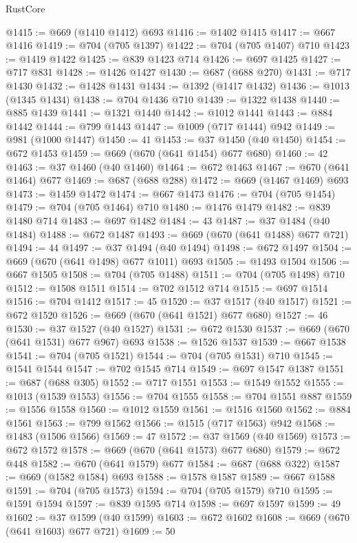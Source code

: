 \begin{lexlean}{RustCore}
\begin{coremodule}
@1415 := @669 (@1410 @1412) @693
@1416 := @1402 @1415
@1417 := @667 @1416
@1419 := @704 (@705 @1397)
@1422 := @704 (@705 @1407) @710
@1423 := @1419 @1422
@1425 := @839 @1423 @714
@1426 := @697 @1425
@1427 := @717 @831
@1428 := @1426 @1427
@1430 := @687 (@688 @270)
@1431 := @717 @1430
@1432 := @1428 @1431
@1434 := @1392 (@1417 @1432)
@1436 := @1013 (@1345 @1434)
@1438 := @704 @1436 @710
@1439 := @1322 @1438
@1440 := @885 @1439
@1441 := @1321 @1440
@1442 := @1012 @1441
@1443 := @884 @1442
@1444 := @799 @1443
@1447 := @1009 (@717 @1444) @942
@1449 := @981 (@1000 @1447)
@1450 := 41
@1453 := @37 @1450 (@40 @1450)
@1454 := @672 @1453
@1459 := @669 (@670 (@641 @1454) @677 @680)
@1460 := 42
@1463 := @37 @1460 (@40 @1460)
@1464 := @672 @1463
@1467 := @670 (@641 @1464) @677
@1469 := @687 (@688 @288)
@1472 := @669 (@1467 @1469) @693
@1473 := @1459 @1472
@1474 := @667 @1473
@1476 := @704 (@705 @1454)
@1479 := @704 (@705 @1464) @710
@1480 := @1476 @1479
@1482 := @839 @1480 @714
@1483 := @697 @1482
@1484 := 43
@1487 := @37 @1484 (@40 @1484)
@1488 := @672 @1487
@1493 := @669 (@670 (@641 @1488) @677 @721)
@1494 := 44
@1497 := @37 @1494 (@40 @1494)
@1498 := @672 @1497
@1504 := @669 (@670 (@641 @1498) @677 @1011) @693
@1505 := @1493 @1504
@1506 := @667 @1505
@1508 := @704 (@705 @1488)
@1511 := @704 (@705 @1498) @710
@1512 := @1508 @1511
@1514 := @702 @1512 @714
@1515 := @697 @1514
@1516 := @704 @1412
@1517 := 45
@1520 := @37 @1517 (@40 @1517)
@1521 := @672 @1520
@1526 := @669 (@670 (@641 @1521) @677 @680)
@1527 := 46
@1530 := @37 @1527 (@40 @1527)
@1531 := @672 @1530
@1537 := @669 (@670 (@641 @1531) @677 @967) @693
@1538 := @1526 @1537
@1539 := @667 @1538
@1541 := @704 (@705 @1521)
@1544 := @704 (@705 @1531) @710
@1545 := @1541 @1544
@1547 := @702 @1545 @714
@1549 := @697 @1547 @1387
@1551 := @687 (@688 @305)
@1552 := @717 @1551
@1553 := @1549 @1552
@1555 := @1013 (@1539 @1553)
@1556 := @704 @1555
@1558 := @704 @1551 @887
@1559 := @1556 @1558
@1560 := @1012 @1559
@1561 := @1516 @1560
@1562 := @884 @1561
@1563 := @799 @1562
@1566 := @1515 (@717 @1563) @942
@1568 := @1483 (@1506 @1566)
@1569 := 47
@1572 := @37 @1569 (@40 @1569)
@1573 := @672 @1572
@1578 := @669 (@670 (@641 @1573) @677 @680)
@1579 := @672 @448
@1582 := @670 (@641 @1579) @677
@1584 := @687 (@688 @322)
@1587 := @669 (@1582 @1584) @693
@1588 := @1578 @1587
@1589 := @667 @1588
@1591 := @704 (@705 @1573)
@1594 := @704 (@705 @1579) @710
@1595 := @1591 @1594
@1597 := @839 @1595 @714
@1598 := @697 @1597
@1599 := 49
@1602 := @37 @1599 (@40 @1599)
@1603 := @672 @1602
@1608 := @669 (@670 (@641 @1603) @677 @721)
@1609 := 50

\end{coremodule}
\end{lexlean}
